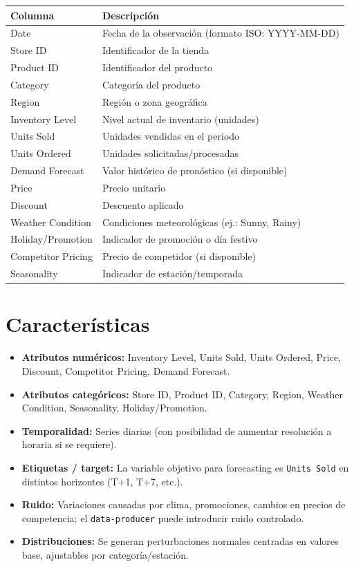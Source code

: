 \documentclass[12pt,a4paper]{article}
\begin{document}
	\begin{table}[h!]
		\centering
		\begin{tabular}{@{}ll@{}}
			\toprule
			\textbf{Columna} & \textbf{Descripción} \\ \midrule
			Date & Fecha de la observación (formato ISO: YYYY-MM-DD) \\
			Store ID & Identificador de la tienda \\
			Product ID & Identificador del producto \\
			Category & Categoría del producto \\
			Region & Región o zona geográfica \\
			Inventory Level & Nivel actual de inventario (unidades) \\
			Units Sold & Unidades vendidas en el periodo \\
			Units Ordered & Unidades solicitadas/procesadas \\
			Demand Forecast & Valor histórico de pronóstico (si disponible) \\
			Price & Precio unitario \\
			Discount & Descuento aplicado \\
			Weather Condition & Condiciones meteorológicas (ej.: Sunny, Rainy) \\
			Holiday/Promotion & Indicador de promoción o día festivo \\
			Competitor Pricing & Precio de competidor (si disponible) \\
			Seasonality & Indicador de estación/temporada \\ \bottomrule
		\end{tabular}
	\end{table}
	
	\section{Características}
	\begin{itemize}
		\item \textbf{Atributos numéricos:} Inventory Level, Units Sold, Units Ordered, Price, Discount, Competitor Pricing, Demand Forecast.
		\item \textbf{Atributos categóricos:} Store ID, Product ID, Category, Region, Weather Condition, Seasonality, Holiday/Promotion.
		\item \textbf{Temporalidad:} Series diarias (con posibilidad de aumentar resolución a horaria si se requiere).
		\item \textbf{Etiquetas / target:} La variable objetivo para forecasting es \texttt{Units Sold} en distintos horizontes (T+1, T+7, etc.).
		\item \textbf{Ruido:} Variaciones causadas por clima, promociones, cambios en precios de competencia; el \texttt{data-producer} puede introducir ruido controlado.
		\item \textbf{Distribuciones:} Se generan perturbaciones normales centradas en valores base, ajustables por categoría/estación.
	\end{itemize}
	
\end{document}
